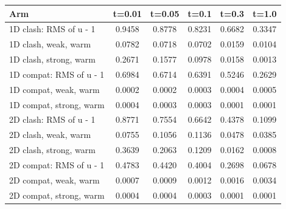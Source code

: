 \begin{tabular}{lccccc}
\toprule
Arm & t=0.01 & t=0.05 & t=0.1 & t=0.3 & t=1.0 \\
\midrule
1D clash: RMS of u - 1 & 0.9458 & 0.8778 & 0.8231 & 0.6682 & 0.3347 \\
1D clash, weak, warm & 0.0782 & 0.0718 & 0.0702 & 0.0159 & 0.0104 \\
1D clash, strong, warm & 0.2671 & 0.1577 & 0.0978 & 0.0158 & 0.0013 \\
1D compat: RMS of u - 1 & 0.6984 & 0.6714 & 0.6391 & 0.5246 & 0.2629 \\
1D compat, weak, warm & 0.0002 & 0.0002 & 0.0003 & 0.0004 & 0.0005 \\
1D compat, strong, warm & 0.0004 & 0.0003 & 0.0003 & 0.0001 & 0.0001 \\
2D clash: RMS of u - 1 & 0.8771 & 0.7554 & 0.6642 & 0.4378 & 0.1099 \\
2D clash, weak, warm & 0.0755 & 0.1056 & 0.1136 & 0.0478 & 0.0385 \\
2D clash, strong, warm & 0.3639 & 0.2063 & 0.1209 & 0.0162 & 0.0008 \\
2D compat: RMS of u - 1 & 0.4783 & 0.4420 & 0.4004 & 0.2698 & 0.0678 \\
2D compat, weak, warm & 0.0007 & 0.0009 & 0.0012 & 0.0016 & 0.0034 \\
2D compat, strong, warm & 0.0004 & 0.0004 & 0.0003 & 0.0001 & 0.0001 \\
\bottomrule
\end{tabular}

